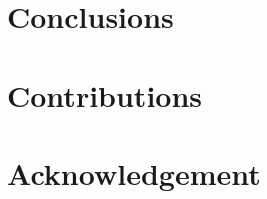 \documentclass[12pt, letterpaper]{article}
\begin{document}
\section{Conclusions}

\section*{Contributions}

\section*{Acknowledgement}

\newpage

\singlespacing

\printbibliography

\newpage
\end{document}
